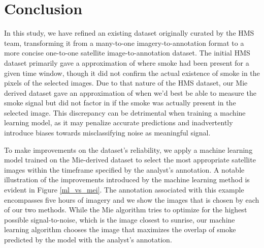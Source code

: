 \documentclass{ametsocV6.1}
\begin{document}
\section{Conclusion}


In this study, we have refined an existing dataset originally curated by the HMS team, transforming it from a many-to-one imagery-to-annotation format to a more concise one-to-one satellite image-to-annotation dataset. The initial HMS dataset primarily gave a approximation of where smoke had been present for a given time window, though it did not confirm the actual existence of smoke in the pixels of the selected images. Due to that nature of the HMS dataset, our Mie derived dataset gave an approximation of when we'd best be able to measure the smoke signal but did not factor in if the smoke was actually present in the selected image. This discrepancy can be detrimental when training a machine learning model, as it may penalize accurate predictions and inadvertently introduce biases towards misclassifying noise as meaningful signal. 

To make improvements on the dataset's reliability, we apply a machine learning model trained on the Mie-derived dataset to select the most appropriate satellite images within the timeframe specified by the analyst's annotation. A notable illustration of the improvements introduced by the machine learning method is evident in Figure \ref{ml_vs_mei}. The annotation associated with this example encompasses five hours of imagery and we show the images that is chosen by each of our two methods. While the Mie algorithm tries to optimize for the highest possible signal-to-noise, which is the image closest to sunrise, our machine learning algorithm chooses the image that maximizes the overlap of smoke predicted by the model with the analyst's annotation.
\end{document}

